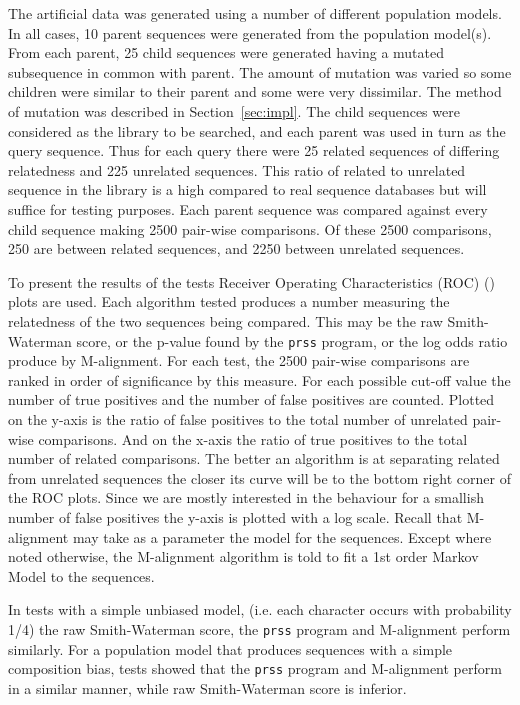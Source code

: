 \documentclass[letterpaper,11pt,oneside]{article}
\begin{document}
\begin{multicols}{2}
The artificial data was generated using a number of different population
models.  In all cases, 10 parent sequences were generated from the population
model(s). From
each parent, 25 child sequences were generated having a mutated
subsequence in common with parent.  The amount of mutation was varied so some
children were similar to their parent and some were very dissimilar.  The
method of mutation was described in Section~\ref{sec:impl}.
The child sequences were
considered as the library to be searched, and each parent was used in turn as
the query sequence.  Thus for each query there were 25 related sequences of
differing relatedness and 225 unrelated sequences.  This ratio of related to
unrelated sequence in the library is a high compared to real sequence
databases but will suffice for testing purposes.  Each parent sequence was
compared against every child sequence making 2500 pair-wise comparisons.  Of
these 2500 comparisons, 250 are between related sequences, and 2250 between
unrelated sequences.

To present the results of the tests Receiver Operating Characteristics (ROC)
(\cite{gribskov96, brenner98}) plots are used.  Each algorithm tested produces
a number measuring the relatedness of the two sequences being compared.  This
may be the raw Smith-Waterman score, or the p-value found by the \verb!prss! 
program, or the log odds ratio produce by M-alignment.  For each test, the
2500 pair-wise comparisons are ranked in order of significance by this
measure.  For each possible cut-off value the number of true positives and the
number of false positives are counted.  Plotted on the y-axis is the ratio of
false positives to the total number of unrelated pair-wise comparisons.  And
on the x-axis the ratio of true positives to the total number of related
comparisons.  The better an algorithm is at separating related from unrelated
sequences the closer its curve will be to the bottom right corner of the ROC
plots.  Since we are mostly interested in the behaviour for a smallish number
of false positives the y-axis is plotted with a log scale.  Recall that
M-alignment may take as a parameter the model for the sequences.  Except where
noted otherwise, the M-alignment algorithm is told to fit a 1st order Markov
Model to the sequences.

In tests with a simple unbiased model, (i.e. each character occurs with
probability 1/4) the raw Smith-Waterman score, the \verb!prss! program and
M-alignment perform similarly.  For a population model that produces sequences
with a simple composition bias, tests showed that the \verb!prss! program and
M-alignment perform in a similar manner, while raw Smith-Waterman score is
inferior.


\end{multicols}
\end{document}
